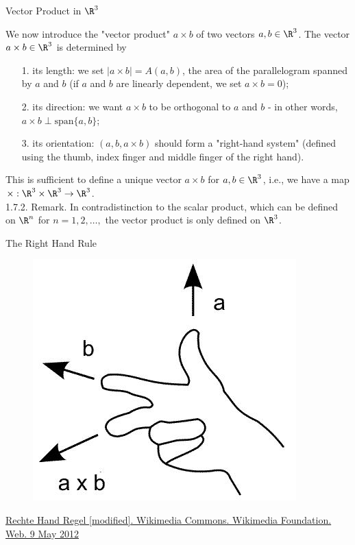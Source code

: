 \documentclass[smaller,hyperref={CJKbookmarks=true}]{beamer}
\begin{document}
\begin{frame}[t,shrink]{Vector Product in $\R^3$}
\begin{spacing}{1.2}
We now introduce the "vector product" $a\times b$ of two vectors $a,b\in\R^3$. The vector $a\times b\in\R^3$ is determined by
\begin{itemize}
  \item[1.] its length: we set $|a\times b|=A(a,b)$, the area of the parallelogram spanned by $a$ and $b$ (if $a$ and $b$ are linearly dependent, we set $a\times b=0$);
  \item[2.] its direction: we want $a\times b$ to be orthogonal to $a$ and $b$ - in other words, $a\times b\perp\text{span}\{a,b\}$;
  \item[3.] its orientation: $(a,b,a\times b)$ should form a "right-hand system"
      (defined using the thumb, index finger and middle finger of the right
      hand).
\end{itemize}
This is suf{}ficient to define a unique vector $a\times b$ for $a,b\in\R^3$, i.e., we have a map $\times:\R^3\times\R^3\to\R^3$.\\
\alert{1.7.2. Remark.} In contradistinction to the scalar product, which can be defined on
$\R^n$ for $n=1,2,\ldots,$ the vector product is only defined on $\R^3$.
\end{spacing}
\end{frame}
\begin{frame}{The Right Hand Rule}
\begin{figure}
  \centering
  \includegraphics[scale=0.8]{righthand.jpg}

\end{figure}
\begin{center}
  {\tiny\href{https://commons.wikimedia.org/wiki/File:RHR.svg}{Rechte Hand Regel [modified]. Wikimedia Commons. Wikimedia Foundation. Web. 9 May 2012}}
\end{center}
\end{frame}
\end{document}
